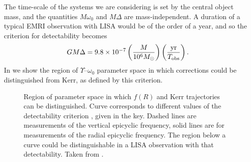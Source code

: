 The time-scale of the systems we are considering is set by the central object mass, and the quantities $M\omega_0$ and $M\Delta$ are mass-independent. A duration of a typical EMRI observation with LISA would be of the order of a year, and so the criterion for detectability becomes \citep{Berry2011}
\begin{equation}
GM\Delta = 9.8\times10^{-7} \left(\dfrac{M}{10^6 M_{\odot}}\right) \left(\dfrac{\mathrm{yr}}{T_\mathrm{obs}}\right). \label{eq:detcrit}
\end{equation}
In  we show the region of $\Upsilon$--$\omega_0$ parameter space in which corrections could be distinguished from Kerr, as defined by this criterion.
\begin{figure}%
\centering
{}
\quad{}
\caption{Region of parameter space in which $f(R)$ and Kerr trajectories can be distinguished. Curve corresponds to different values of the detectability criterion , given in the key. Dashed lines are measurements of the vertical epicyclic frequency, solid lines are for measurements of the radial epicyclic frequency. The region below a curve could be distinguishable in a LISA observation with that detectability. Taken from \citet{Berry2011}.}
\label{fig:epifig}
\end{figure}
